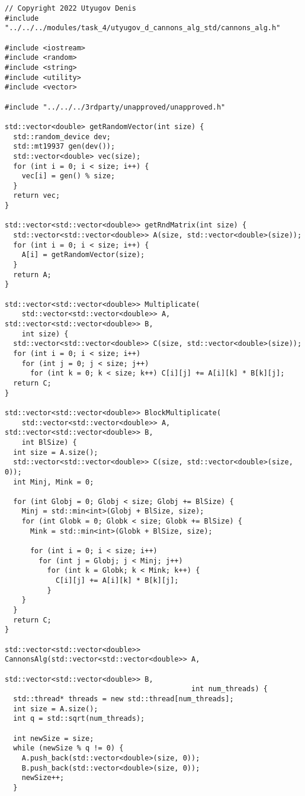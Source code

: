 \documentclass{report}
\begin{document}
\begin{lstlisting}
// Copyright 2022 Utyugov Denis
#include "../../../modules/task_4/utyugov_d_cannons_alg_std/cannons_alg.h"

#include <iostream>
#include <random>
#include <string>
#include <utility>
#include <vector>

#include "../../../3rdparty/unapproved/unapproved.h"

std::vector<double> getRandomVector(int size) {
  std::random_device dev;
  std::mt19937 gen(dev());
  std::vector<double> vec(size);
  for (int i = 0; i < size; i++) {
    vec[i] = gen() % size;
  }
  return vec;
}

std::vector<std::vector<double>> getRndMatrix(int size) {
  std::vector<std::vector<double>> A(size, std::vector<double>(size));
  for (int i = 0; i < size; i++) {
    A[i] = getRandomVector(size);
  }
  return A;
}

std::vector<std::vector<double>> Multiplicate(
    std::vector<std::vector<double>> A, std::vector<std::vector<double>> B,
    int size) {
  std::vector<std::vector<double>> C(size, std::vector<double>(size));
  for (int i = 0; i < size; i++)
    for (int j = 0; j < size; j++)
      for (int k = 0; k < size; k++) C[i][j] += A[i][k] * B[k][j];
  return C;
}

std::vector<std::vector<double>> BlockMultiplicate(
    std::vector<std::vector<double>> A, std::vector<std::vector<double>> B,
    int BlSize) {
  int size = A.size();
  std::vector<std::vector<double>> C(size, std::vector<double>(size, 0));
  int Minj, Mink = 0;

  for (int Globj = 0; Globj < size; Globj += BlSize) {
    Minj = std::min<int>(Globj + BlSize, size);
    for (int Globk = 0; Globk < size; Globk += BlSize) {
      Mink = std::min<int>(Globk + BlSize, size);

      for (int i = 0; i < size; i++)
        for (int j = Globj; j < Minj; j++)
          for (int k = Globk; k < Mink; k++) {
            C[i][j] += A[i][k] * B[k][j];
          }
    }
  }
  return C;
}

std::vector<std::vector<double>> CannonsAlg(std::vector<std::vector<double>> A,
                                            std::vector<std::vector<double>> B,
                                            int num_threads) {
  std::thread* threads = new std::thread[num_threads];
  int size = A.size();
  int q = std::sqrt(num_threads);

  int newSize = size;
  while (newSize % q != 0) {
    A.push_back(std::vector<double>(size, 0));
    B.push_back(std::vector<double>(size, 0));
    newSize++;
  }


\end{lstlisting}
\end{document}

